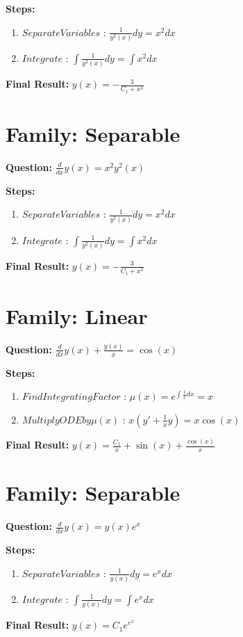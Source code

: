 \documentclass{article}
\begin{document}
\textbf{Steps:}
\begin{enumerate}
\item $Separate Variables$ :  $\frac{1}{y^{2}{\left(x \right)}} dy = x^{2} dx$
\item $Integrate$ :  $\int \frac{1}{y^{2}{\left(x \right)}} dy = \int x^{2} dx$
\end{enumerate}
\textbf{Final Result:} $y{\left(x \right)} = - \frac{3}{C_{1} + x^{3}}$

\section*{Family: Separable}
\textbf{Question:} $\frac{d}{d x} y{\left(x \right)} = x^{2} y^{2}{\left(x \right)}$

\textbf{Steps:}
\begin{enumerate}
\item $Separate Variables$ :  $\frac{1}{y^{2}{\left(x \right)}} dy = x^{2} dx$
\item $Integrate$ :  $\int \frac{1}{y^{2}{\left(x \right)}} dy = \int x^{2} dx$
\end{enumerate}
\textbf{Final Result:} $y{\left(x \right)} = - \frac{3}{C_{1} + x^{3}}$

\section*{Family: Linear}
\textbf{Question:} $\frac{d}{d x} y{\left(x \right)} + \frac{y{\left(x \right)}}{x} = \cos{\left(x \right)}$

\textbf{Steps:}
\begin{enumerate}
\item $Find Integrating Factor$ :  $\mu(x) = e^{\int \frac{1}{x} dx} = x$
\item $Multiply ODE by \mu(x)$ :  $x(y' + \frac{1}{x}y) = x \cos{\left(x \right)}$
\end{enumerate}
\textbf{Final Result:} $y{\left(x \right)} = \frac{C_{1}}{x} + \sin{\left(x \right)} + \frac{\cos{\left(x \right)}}{x}$

\section*{Family: Separable}
\textbf{Question:} $\frac{d}{d x} y{\left(x \right)} = y{\left(x \right)} e^{x}$

\textbf{Steps:}
\begin{enumerate}
\item $Separate Variables$ :  $\frac{1}{y{\left(x \right)}} dy = e^{x} dx$
\item $Integrate$ :  $\int \frac{1}{y{\left(x \right)}} dy = \int e^{x} dx$
\end{enumerate}
\textbf{Final Result:} $y{\left(x \right)} = C_{1} e^{e^{x}}$
\end{document}
